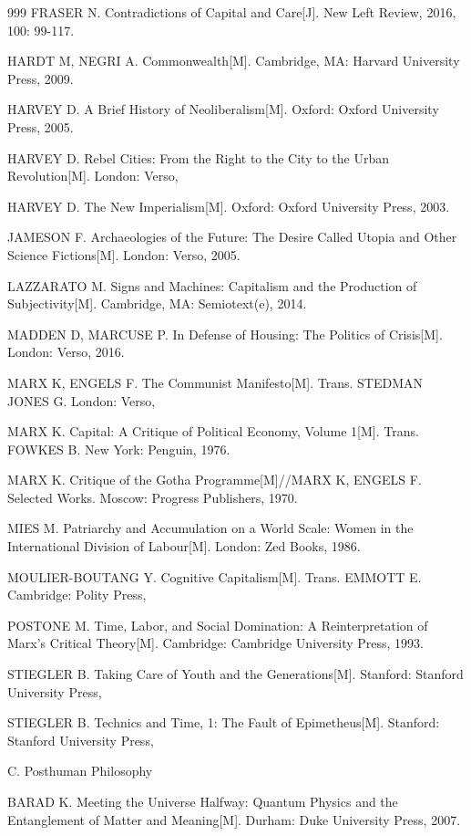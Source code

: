 \begin{thebibliography}{999}
\bibitem{} FRASER N. Contradictions of Capital and Care[J]. New Left Review, 2016, 100: 99-117.

\bibitem{} HARDT M, NEGRI A. Commonwealth[M]. Cambridge, MA: Harvard University Press, 2009.

\bibitem{} HARVEY D. A Brief History of Neoliberalism[M]. Oxford: Oxford University Press, 2005.

\bibitem{} HARVEY D. Rebel Cities: From the Right to the City to the Urban Revolution[M]. London: Verso,

\bibitem{} HARVEY D. The New Imperialism[M]. Oxford: Oxford University Press, 2003.

\bibitem{} JAMESON F. Archaeologies of the Future: The Desire Called Utopia and Other Science Fictions[M]. London: Verso, 2005.

\bibitem{} LAZZARATO M. Signs and Machines: Capitalism and the Production of Subjectivity[M]. Cambridge, MA: Semiotext(e), 2014.

\bibitem{} MADDEN D, MARCUSE P. In Defense of Housing: The Politics of Crisis[M]. London: Verso, 2016.

\bibitem{} MARX K, ENGELS F. The Communist Manifesto[M]. Trans. STEDMAN JONES G. London: Verso,

\bibitem{} MARX K. Capital: A Critique of Political Economy, Volume 1[M]. Trans. FOWKES B. New York: Penguin, 1976.

\bibitem{} MARX K. Critique of the Gotha Programme[M]//MARX K, ENGELS F. Selected Works. Moscow: Progress Publishers, 1970.

\bibitem{} MIES M. Patriarchy and Accumulation on a World Scale: Women in the International Division of Labour[M]. London: Zed Books, 1986.

\bibitem{} MOULIER-BOUTANG Y. Cognitive Capitalism[M]. Trans. EMMOTT E. Cambridge: Polity Press,

\bibitem{} POSTONE M. Time, Labor, and Social Domination: A Reinterpretation of Marx’s Critical Theory[M]. Cambridge: Cambridge University Press, 1993.

\bibitem{} STIEGLER B. Taking Care of Youth and the Generations[M]. Stanford: Stanford University Press,

\bibitem{} STIEGLER B. Technics and Time, 1: The Fault of Epimetheus[M]. Stanford: Stanford University Press,

\bibitem{} C. Posthuman Philosophy

\bibitem{} BARAD K. Meeting the Universe Halfway: Quantum Physics and the Entanglement of Matter and Meaning[M]. Durham: Duke University Press, 2007.


\end{thebibliography}
